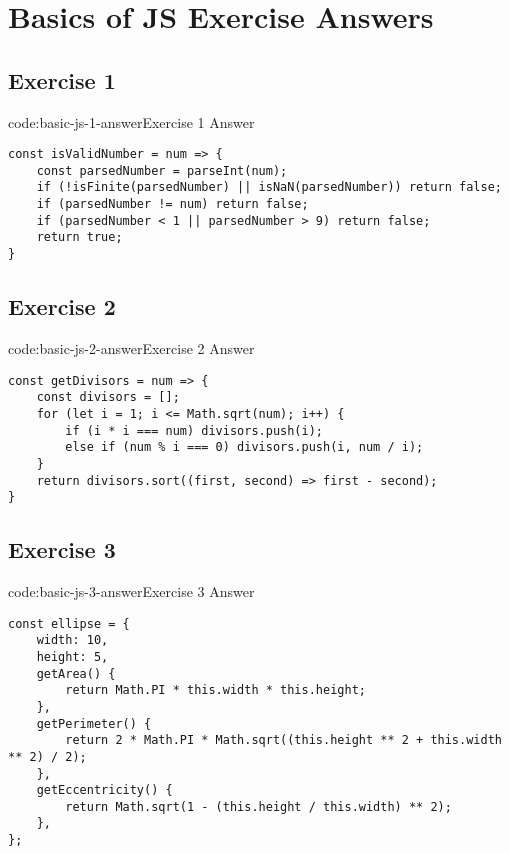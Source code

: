 \section{Basics of JS Exercise Answers} \label{sect:basic-js-exercise-answers}

\subsection*{Exercise 1}

\begin{codeenv}{code:basic-js-1-answer}{Exercise 1 Answer}\begin{verbatim}
const isValidNumber = num => {
    const parsedNumber = parseInt(num);
    if (!isFinite(parsedNumber) || isNaN(parsedNumber)) return false;
    if (parsedNumber != num) return false;
    if (parsedNumber < 1 || parsedNumber > 9) return false;
    return true;
}
\end{verbatim}
\end{codeenv}

\subsection*{Exercise 2}

\begin{codeenv}{code:basic-js-2-answer}{Exercise 2 Answer}\begin{verbatim}
const getDivisors = num => {
    const divisors = [];
    for (let i = 1; i <= Math.sqrt(num); i++) {
        if (i * i === num) divisors.push(i);
        else if (num % i === 0) divisors.push(i, num / i);
    }
    return divisors.sort((first, second) => first - second);
}
\end{verbatim}
\end{codeenv}

\subsection*{Exercise 3}

\begin{codeenv}{code:basic-js-3-answer}{Exercise 3 Answer}\begin{verbatim}
const ellipse = {
    width: 10,
    height: 5,
    getArea() {
        return Math.PI * this.width * this.height;
    },
    getPerimeter() {
        return 2 * Math.PI * Math.sqrt((this.height ** 2 + this.width ** 2) / 2);
    },
    getEccentricity() {
        return Math.sqrt(1 - (this.height / this.width) ** 2);
    },
};
\end{verbatim}
\end{codeenv}
